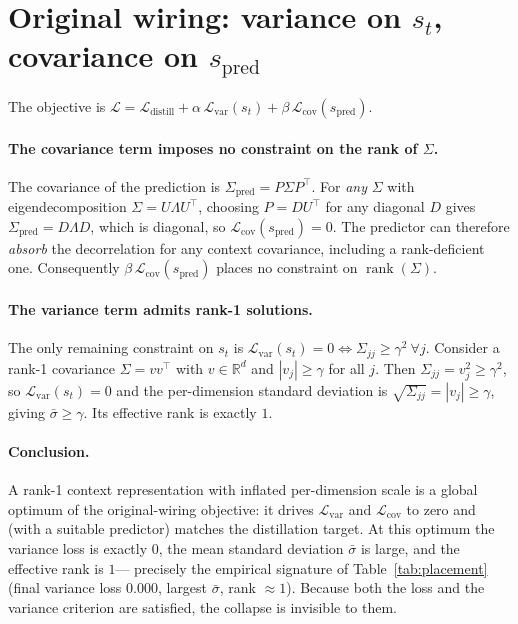 \section{Original wiring: variance on $s_t$, covariance on $s_{\text{pred}}$}
The objective is
$\mathcal{L} = \mathcal{L}_{\text{distill}}
+ \alpha\,\mathcal{L}_{\text{var}}(s_t) + \beta\,\mathcal{L}_{\text{cov}}(s_{\text{pred}})$.

\paragraph{The covariance term imposes no constraint on the rank of $\Sigma$.}
The covariance of the prediction is $\Sigma_{\text{pred}} = P \Sigma P^{\top}$.
For \emph{any} $\Sigma$ with eigendecomposition $\Sigma = U \Lambda U^{\top}$,
choosing $P = D U^{\top}$ for any diagonal $D$ gives
$\Sigma_{\text{pred}} = D \Lambda D$, which is diagonal, so
$\mathcal{L}_{\text{cov}}(s_{\text{pred}}) = 0$. The predictor can therefore
\emph{absorb} the decorrelation for any context covariance, including a
rank-deficient one. Consequently $\beta\,\mathcal{L}_{\text{cov}}(s_{\text{pred}})$
places no constraint on $\operatorname{rank}(\Sigma)$.

\paragraph{The variance term admits rank-1 solutions.}
The only remaining constraint on $s_t$ is
$\mathcal{L}_{\text{var}}(s_t) = 0 \iff \Sigma_{jj} \ge \gamma^{2}\ \forall j$.
Consider a rank-1 covariance $\Sigma = v v^{\top}$ with
$v \in \mathbb{R}^{d}$ and $|v_j| \ge \gamma$ for all $j$. Then
$\Sigma_{jj} = v_j^{2} \ge \gamma^{2}$, so $\mathcal{L}_{\text{var}}(s_t) = 0$
and the per-dimension standard deviation is $\sqrt{\Sigma_{jj}} = |v_j| \ge \gamma$,
giving $\bar\sigma \ge \gamma$. Its effective rank is exactly $1$.

\paragraph{Conclusion.}
A rank-1 context representation with inflated per-dimension scale is a global
optimum of the original-wiring objective: it drives $\mathcal{L}_{\text{var}}$
and $\mathcal{L}_{\text{cov}}$ to zero and (with a suitable predictor) matches
the distillation target. At this optimum the variance loss is exactly $0$, the
mean standard deviation $\bar\sigma$ is large, and the effective rank is $1$---%
precisely the empirical signature of Table~\ref{tab:placement} (final
variance loss $0.000$, largest $\bar\sigma$, rank $\approx 1$). Because both
the loss and the variance criterion are satisfied, the collapse is invisible
to them.


